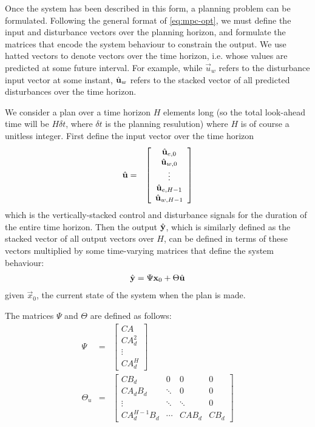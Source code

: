 Once the system has been described in this form, a planning problem can be formulated.
Following the general format of \autoref{eq:mpc-opt}, we must define the input and disturbance vectors over the planning horizon, and formulate the matrices that encode the system behaviour to constrain the output.
We use hatted vectors to denote vectors over the time horizon, i.e. whose values are predicted at some future interval.
For example, while $\vec{u}_w$ refers to the disturbance input vector at some instant, $\hat{\mathbf{u}}_w$ refers to the stacked vector of all predicted disturbances over the time horizon.

We consider a plan over a time horizon $H$ elements long (so the total look-ahead time will be $H \delta t$, where $\delta t$ is the planning resulution) where $H$ is of course a unitless integer.
First define the input vector over the time horizon
\begin{eqnarray*}
   \hat{\mathbf{u}} &=& \left[\begin{array}{c}
      \hat{\mathbf{u}}_{e, 0} \\ \hat{\mathbf{u}}_{w, 0} \\
      \vdots \\
      \hat{\mathbf{u}}_{e, H-1} \\ \hat{\mathbf{u}}_{w, H-1}
   \end{array}\right]
\end{eqnarray*}
which is the vertically-stacked control and disturbance signals for the duration of the entire time horizon.
Then the output $\hat{\mathbf{y}}$, which is similarly defined as the stacked vector of all output vectors over $H$, can be defined in terms of these vectors multiplied by some time-varying matrices that define the system behaviour:
\begin{eqnarray}
   \label{eq:mpc-vectors}
	\hat{\mathbf{y}} = \Psi \mathbf{x}_0 + \Theta \hat{\mathbf{u}}
\end{eqnarray}
given $\vec{x}_0$, the current state of the system when the plan is made.

The matrices $\Psi$ and $\Theta$ are defined as follows:
\begin{eqnarray}
   \label{eq:mpc-psi}
   \Psi &=& \left[\begin{array}{c}
      CA \\ CA_d^2 \\ \vdots \\ CA_d^H
   \end{array}\right]
   \\
	\label{eq:mpc-theta}
   \Theta_u &=& \left[\begin{array}{cccc}
		C B_d & 0 & 0 & 0 \\
		C A_d B_d & \ddots & 0 & 0 \\
      \vdots & \ddots & \ddots & 0 \\
		C A_d ^{H-1} B_d & \cdots & C A B_d & C B_d
   \end{array}\right]
\end{eqnarray}

